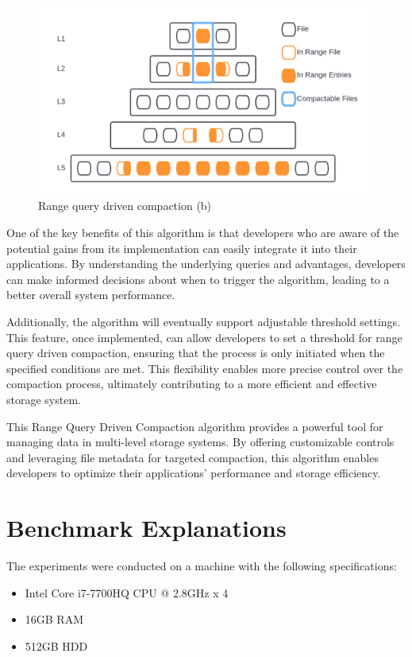 \documentclass[balance=false, sigconf]{acmart}
\begin{document}
\begin{figure}
  \centering
  \includegraphics[scale=0.12]{Figures/LSM2.png}
  \caption{Range query driven compaction (b)}
  \label{fig:LSM-tree-b}
\end{figure}

One of the key benefits of this algorithm is that developers who are aware of the potential gains from its implementation can easily integrate it into 
their applications. By understanding the underlying queries and advantages, developers can make informed decisions about when to trigger the algorithm, 
leading to a better overall system performance.

Additionally, the algorithm will eventually support adjustable threshold settings. This feature, once implemented, can allow developers to set a threshold for range query driven compaction, ensuring that 
the process is only initiated when the specified conditions are met. This flexibility enables more precise control over the compaction process, 
ultimately contributing to a more efficient and effective storage system.

This Range Query Driven Compaction algorithm provides a powerful tool for managing data in multi-level storage systems. By offering customizable controls 
and leveraging file metadata for targeted compaction, this algorithm enables developers to optimize their applications' performance and storage efficiency.

\section{Benchmark Explanations}
The experiments were conducted on a machine with the following specifications:

\begin{itemize}
\item Intel Core i7-7700HQ CPU @ 2.8GHz x 4
\item 16GB RAM
\item 512GB HDD
\end{itemize}
\end{document}
